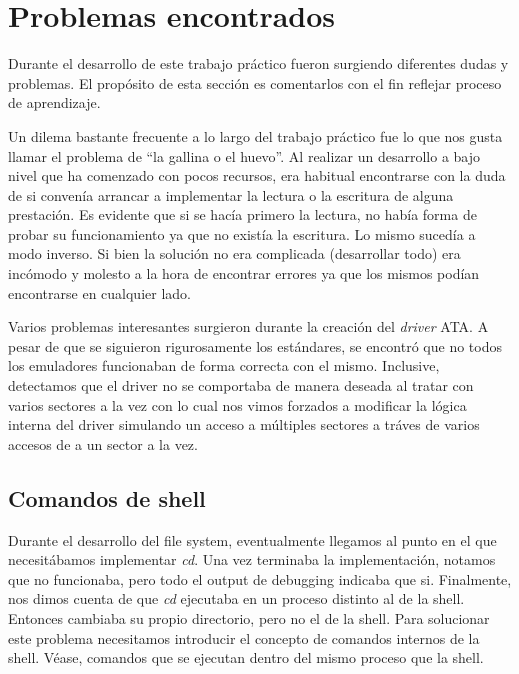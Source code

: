 \documentclass[a4paper,10pt]{article}
\begin{document}
\newpage
\section{Problemas encontrados}

Durante el desarrollo de este trabajo práctico fueron surgiendo diferentes dudas y problemas. El propósito de esta
sección es comentarlos con el fin reflejar proceso de aprendizaje.

Un dilema bastante frecuente a lo largo del trabajo práctico fue lo que nos gusta llamar el problema de ``la gallina o el huevo''. Al realizar
un desarrollo a bajo nivel que ha comenzado con pocos recursos, era habitual encontrarse con la duda de si convenía
arrancar a implementar la lectura o la escritura de alguna prestación. Es evidente que si se hacía primero la lectura, 
no había forma de probar su funcionamiento ya que no existía la escritura. Lo mismo sucedía a modo inverso. Si bien 
la solución no era complicada (desarrollar todo) era incómodo y molesto a la hora de encontrar errores ya que los mismos
podían encontrarse en cualquier lado.

Varios problemas interesantes surgieron durante la creación del \textit{driver} ATA. A pesar de que se siguieron
rigurosamente los estándares, se encontró que no todos los emuladores funcionaban de forma correcta con el mismo.
Inclusive, detectamos que el driver no se comportaba de manera deseada al tratar con varios sectores a la vez con lo
cual nos vimos forzados a modificar la lógica interna del driver simulando un acceso a múltiples sectores a tráves de
varios accesos de a un sector a la vez.


        \subsection{Comandos de shell}
        Durante el desarrollo del file system, eventualmente llegamos al punto en el que necesitábamos implementar \textit{cd}.
        Una vez terminaba la implementación, notamos que no funcionaba, pero todo el output de debugging indicaba que si.
        Finalmente, nos dimos cuenta de que \textit{cd} ejecutaba en un proceso distinto al de la shell.
        Entonces cambiaba su propio directorio, pero no el de la shell.
        Para solucionar este problema necesitamos introducir el concepto de comandos internos de la shell.
        Véase, comandos que se ejecutan dentro del mismo proceso que la shell.
\end{document}
